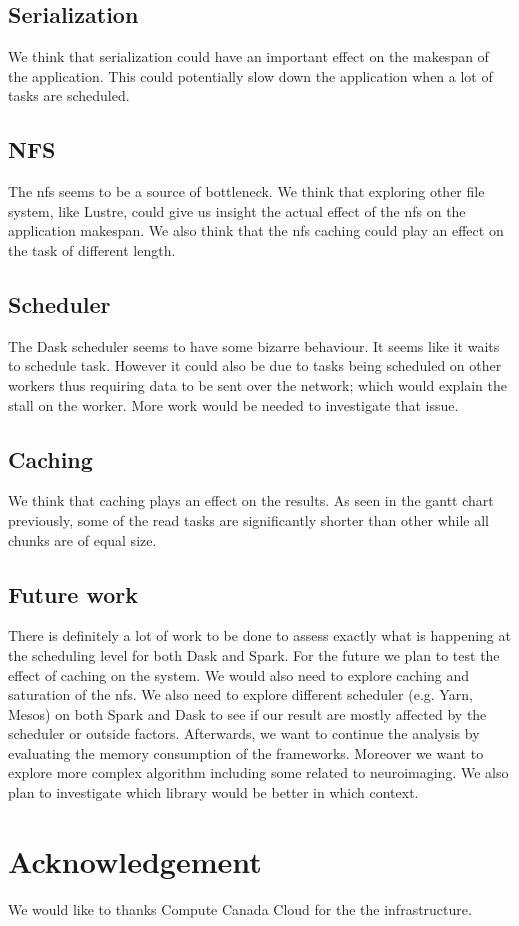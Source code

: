 \documentclass[11pt,a4paper]{article}
\begin{document}
\subsection{Serialization}
We think that serialization could have an important effect on the makespan of the
application. This could potentially slow down the application when a lot of tasks are
scheduled.

\subsection{NFS}
The nfs seems to be a source of bottleneck. We think that exploring other file
system, like Lustre, could give us insight the actual effect of the nfs on the
application makespan. We also think that the nfs caching could play an effect on the
task of different length.

\subsection{Scheduler}
The Dask scheduler seems to have some bizarre behaviour. It seems like it waits to
schedule task. However it could also be due to tasks being scheduled on other workers
thus requiring data to be sent over the network; which would explain the stall on the
worker. More work would be needed to investigate that issue.


\subsection{Caching}
We think that caching plays an effect on the results. As seen in the gantt chart
previously, some of the read tasks are significantly shorter than other while all
chunks are of equal size.



\subsection{Future work}
There is definitely a lot of work to be done to assess exactly what is happening at
the scheduling level for both Dask and Spark. For the future we plan to test the
effect of caching on the system. We would also need to explore caching and saturation
of the nfs. We also need to explore different scheduler (e.g. Yarn, Mesos) on both
Spark and Dask to see if our result are mostly affected by the scheduler or outside
factors. Afterwards, we want to continue the analysis by evaluating the memory
consumption of the frameworks. Moreover we want to explore more complex algorithm
including some related to neuroimaging. We also plan to investigate which library
would be better in which context.

\section{Acknowledgement}
We would like to thanks Compute Canada Cloud for the the infrastructure.



\end{document}
